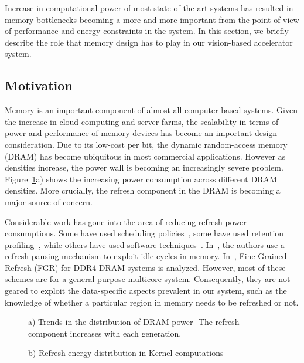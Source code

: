 Increase in computational power of most state-of-the-art systems has resulted in memory bottlenecks becoming a more and more important from the point of view of performance and energy constraints in the system.
In this section, we briefly describe the role that memory design has to play in our vision-based accelerator system.

\subsection{Motivation}
Memory is an important component of almost all computer-based systems. Given the increase in cloud-computing and server farms, the scalability in terms of power and performance of memory devices has become an important design consideration. Due to its low-cost per bit, the dynamic random-access memory (DRAM) has become ubiquitous in most commercial applications. However as densities increase, the power wall is becoming an increasingly severe problem. Figure~\ref{fig:refreshTrends}a) shows the increasing power consumption across different DRAM densities. More crucially, the refresh component in the DRAM is becoming a major source of concern.
 
Considerable work has gone into the area of reducing refresh power consumptions. Some have used scheduling policies~\cite{Stuecheli2010}, some have used retention profiling~\cite{Liu2012}, while others have used software techniques~\cite{Liu2012}. In~\cite{Nair2013}, the authors use a refresh pausing mechanism to exploit idle cycles in memory. In~\cite{Mukundan2013}, Fine Grained Refresh (FGR) for DDR4 DRAM systems is analyzed. 
However, most of these schemes are for a general purpose multicore system. Consequently, they are not geared to exploit the data-specific aspects prevalent in our system, such as the knowledge of whether a particular region in memory needs to be refreshed or not.


\begin{figure}[ht!]
\begin{minipage}[b]{1\linewidth}
\centering
{}
\caption{\label{fig:refreshTrends}a) Trends in the distribution of DRAM power- The refresh component increases with each generation.}
\vspace{0.2in}
\end{minipage}
\addtocounter{figure}{-1}
\begin{minipage}[b]{1\linewidth}
\centering
{}
\caption{\label{fig:refreshTrends}b) Refresh energy distribution in Kernel computations}
\end{minipage}
\end{figure}

